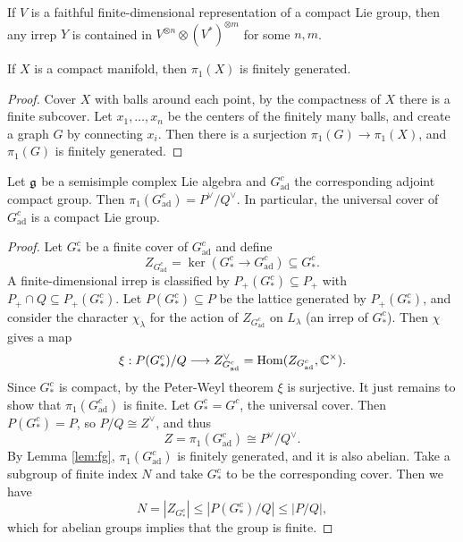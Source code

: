 \begin{prop}\label{prop:faithful}
  If $V$ is a faithful finite-dimensional
  representation of a compact Lie group,
  then
  any irrep $Y$ is contained in
  $V^{\otimes n} \otimes (V^*)^{\otimes m}$
  for some $n, m$.
\end{prop}

\begin{lemma}\label{lem:fg}
  If $X$ is a compact manifold, then
  $\pi_1(X)$ is finitely generated.
\end{lemma}

\begin{proof}
  Cover $X$ with balls around each point,
  by the compactness of $X$
  there is a finite subcover.
  Let $x_1, \dots, x_n$ be the centers of
  the finitely many balls, and create
  a graph $G$ by connecting
  $x_i$. Then there is a surjection
  $\pi_1(G) \to \pi_1(X)$, and 
  $\pi_1(G)$ is finitely generated.
\end{proof}

\begin{theorem}
  Let $\mathfrak{g}$ be a semisimple complex
  Lie algebra and $G^c_{\mathrm{ad}}$
  the corresponding adjoint compact group.
  Then $\pi_1(G^c_{\mathrm{ad}}) = P^\vee / Q^\vee$.
  In particular, the universal cover of
  $G^c_{\mathrm{ad}}$ is a
  compact Lie group.
\end{theorem}

\begin{proof}
  Let $G_*^c$ be a finite cover of
  $G_{\mathrm{ad}}^c$ and define
  \[Z_{G_{\mathrm{ad}}^c} = \ker(G_*^c \to G_{\mathrm{ad}}^c) \subseteq G_*^c.\]
  A finite-dimensional irrep is
  classified by
  $P_+(G_*^c) \subseteq P_+$ with
  $P_+ \cap Q \subseteq P_+(G_*^c)$.
  Let $P(G_*^c) \subseteq P$ be the
  lattice generated by $P_+(G_*^c)$, and
  consider the character $\chi_\lambda$
  for the action of
  $Z_{G_{\mathrm{ad}}^c}$ on
  $L_\lambda$ (an irrep of $G_*^c$).
  Then $\chi$ gives a map
  \[
    \xi : P(G_*^c) / Q
    \longrightarrow
    Z_{G_{\mathrm{ad}}^c}^\vee
    = \operatorname{Hom}(Z_{G_{\mathrm{ad}}^c}, \mathbb{C}^\times).
  \]
  Since $G_*^c$ is compact,
  by the Peter-Weyl theorem $\xi$ is
  surjective. It just remains to show
  that $\pi_1(G^c_{\mathrm{ad}})$ is
  finite. Let
  $G_*^c = G^c$, the universal cover. Then
  $P(G_*^c) = P$, so
  $P / Q \cong Z^\vee$, and thus
  \[
    Z = \pi_1(G^c_{\mathrm{ad}}) \cong P^\vee / Q^\vee.
  \]
  By Lemma \ref{lem:fg}, $\pi_1(G^c_{\mathrm{ad}})$ is finitely generated, and it
  is also abelian. Take a subgroup of
  finite index $N$ and take
  $G_*^c$ to be the corresponding cover.
  Then we have
  \[
    N = |Z_{G_*^c}|
    \le |P(G_*^c) / Q|
    \le |P / Q|,
  \]
  which for abelian groups implies that
  the group is finite.
\end{proof}

